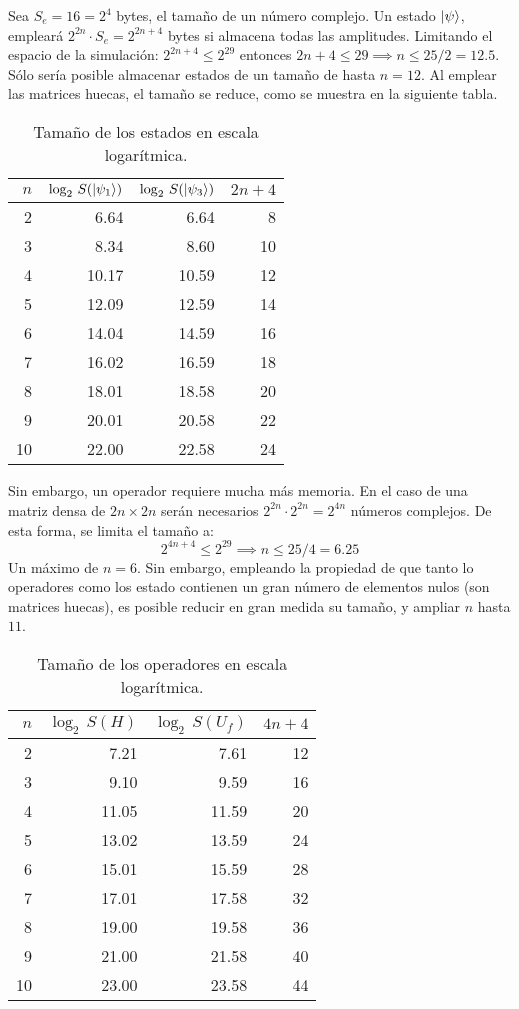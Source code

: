 \begin{ejemplo}
Sea $S_e = 16 = 2^4$ bytes, el tamaño de un número complejo. Un estado 
$\ket{\psi}$, empleará $2^{2n}\cdot S_e = 2^{2n+4}$ bytes si almacena todas las 
amplitudes.  Limitando el espacio de la simulación: $2^{2n+4} \leq 2^{29}$ 
entonces $2n+4 \leq 29 \implies n \leq 25/2 = 12.5$. Sólo sería posible 
almacenar estados de un tamaño de hasta $n=12$.
Al emplear las matrices huecas, el tamaño se reduce, como se muestra en la 
siguiente tabla.

\begin{table}[h]
	\centering
	\begin{tabular}{*{4}{r}}
		\toprule
		$n$ & $\log_2 \, S(\ket{\psi_1})$ & $\log_2 \, S(\ket{\psi_3})$ & $2n+4$ \\
		\midrule
		2 	& 6.64	& 6.64	& 8\\
		3 	& 8.34	& 8.60	& 10\\
		4 	& 10.17	& 10.59	& 12\\
		5 	& 12.09	& 12.59	& 14\\
		6 	& 14.04	& 14.59	& 16\\
		7 	& 16.02	& 16.59	& 18\\
		8 	& 18.01	& 18.58	& 20\\
		9 	& 20.01	& 20.58	& 22\\
		10 	& 22.00	& 22.58	& 24\\
		\bottomrule
	\end{tabular}
	\caption{Tamaño de los estados en escala logarítmica.}
\end{table}

Sin embargo, un operador requiere mucha más memoria. En el caso de una matriz 
densa de $2n \times 2n$ serán necesarios $2^{2n} \cdot 2^{2n} = 2^{4n}$ números 
complejos. De esta forma, se limita el tamaño a:
$$2^{4n+4} \leq 2^{29} \implies n \leq 25/4 = 6.25 $$
Un máximo de $n = 6$. Sin embargo, empleando la propiedad de que tanto lo 
operadores como los estado contienen un gran número de elementos nulos (son 
matrices huecas), es posible reducir en gran medida su tamaño, y ampliar $n$ 
hasta $11$.

\begin{table}[h]
	\centering
	\begin{tabular}{*{4}{r}}
		\toprule
		$n$ & $\log_2 \, S(H)$ & $\log_2 \, S(U_f)$ & $4n+4$ \\
		\midrule
		2 	& 7.21	& 7.61	& 12\\
		3 	& 9.10	& 9.59	& 16\\
		4 	& 11.05	& 11.59	& 20\\
		5 	& 13.02	& 13.59	& 24\\
		6 	& 15.01	& 15.59	& 28\\
		7 	& 17.01	& 17.58	& 32\\
		8 	& 19.00	& 19.58	& 36\\
		9 	& 21.00	& 21.58	& 40\\
		10 	& 23.00	& 23.58	& 44\\
		\bottomrule
	\end{tabular}
	\caption{Tamaño de los operadores en escala logarítmica.}
\end{table}




\end{ejemplo}
